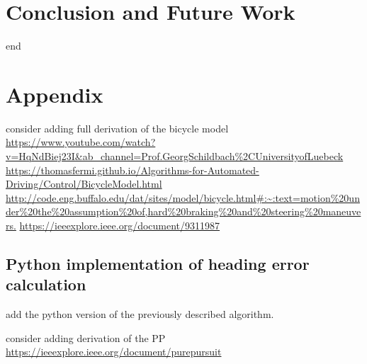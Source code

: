 \documentclass[a4paper,12pt,sort&compress]{article}
\begin{document}




\newpage
\section{Conclusion and Future Work}
end




\newpage
\section{Appendix}
consider adding full derivation of the bicycle model \url{https://www.youtube.com/watch?v=HqNdBiej23I&ab_channel=Prof.GeorgSchildbach%2CUniversityofLuebeck}
\url{https://thomasfermi.github.io/Algorithms-for-Automated-Driving/Control/BicycleModel.html}
\url{http://code.eng.buffalo.edu/dat/sites/model/bicycle.html#:~:text=motion%20under%20the%20assumption%20of,hard%20braking%20and%20steering%20maneuvers.}
\url{https://ieeexplore.ieee.org/document/9311987}

\subsection{Python implementation of heading error calculation}
add the python version of the previously described algorithm.

consider adding derivation of the PP
\url{https://ieeexplore.ieee.org/document/purepursuit}


\newpage
\end{document}
